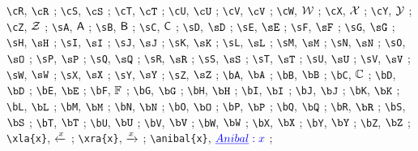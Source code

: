 \verb|\cR|, $\cR$ ; 
\verb|\cS|, $\cS$ ; 
\verb|\cT|, $\cT$ ; 
\verb|\cU|, $\cU$ ; 
\verb|\cV|, $\cV$ ; 
\verb|\cW|, $\mathcal{W}$ ; 
\verb|\cX|, $\mathcal{X}$ ; 
\verb|\cY|, $\mathcal{Y}$ ; 
\verb|\cZ|, $\mathcal{Z}$ ; 
\verb|\sA|, $\mathsf{A}$ ; 
\verb|\sB|, $\mathsf{B}$ ; 
\verb|\sC|, $\mathsf{C}$ ; 
\verb|\sD|, $\sD$ ; 
\verb|\sE|, $\sE$ ; 
\verb|\sF|, $\sF$ ; 
\verb|\sG|, $\sG$ ; 
\verb|\sH|, $\sH$ ; 
\verb|\sI|, $\sI$ ; 
\verb|\sJ|, $\sJ$ ; 
\verb|\sK|, $\sK$ ; 
\verb|\sL|, $\sL$ ; 
\verb|\sM|, $\sM$ ; 
\verb|\sN|, $\sN$ ; 
\verb|\sO|, $\sO$ ; 
\verb|\sP|, $\sP$ ; 
\verb|\sQ|, $\sQ$ ; 
\verb|\sR|, $\sR$ ; 
\verb|\sS|, $\sS$ ; 
\verb|\sT|, $\sT$ ; 
\verb|\sU|, $\sU$ ; 
\verb|\sV|, $\sV$ ; 
\verb|\sW|, $\sW$ ; 
\verb|\sX|, $\sX$ ; 
\verb|\sY|, $\sY$ ; 
\verb|\sZ|, $\sZ$ ; 
\verb|\bA|, $\bA$ ; 
\verb|\bB|, $\bB$ ; 
\verb|\bC|, $\mathbb{C}$ ; 
\verb|\bD|, $\bD$ ; 
\verb|\bE|, $\bE$ ; 
\verb|\bF|, $\mathbb{F}$ ; 
\verb|\bG|, $\bG$ ; 
\verb|\bH|, $\bH$ ; 
\verb|\bI|, $\bI$ ; 
\verb|\bJ|, $\bJ$ ; 
\verb|\bK|, $\bK$ ; 
\verb|\bL|, $\bL$ ; 
\verb|\bM|, $\bM$ ; 
\verb|\bN|, $\bN$ ; 
\verb|\bO|, $\bO$ ; 
\verb|\bP|, $\bP$ ; 
\verb|\bQ|, $\bQ$ ; 
\verb|\bR|, $\bR$ ; 
\verb|\bS|, $\bS$ ; 
\verb|\bT|, $\bT$ ; 
\verb|\bU|, $\bU$ ; 
\verb|\bV|, $\bV$ ; 
\verb|\bW|, $\bW$ ; 
\verb|\bX|, $\bX$ ; 
\verb|\bY|, $\bY$ ; 
\verb|\bZ|, $\bZ$ ; 
\verb|\xla{x}|, $\xleftarrow{x}$ ; 
\verb|\xra{x}|, $\xrightarrow{x}$ ; 
\verb|\anibal{x}|, $\textcolor{blue}{\underline{Anibal}: x}$ ; 
